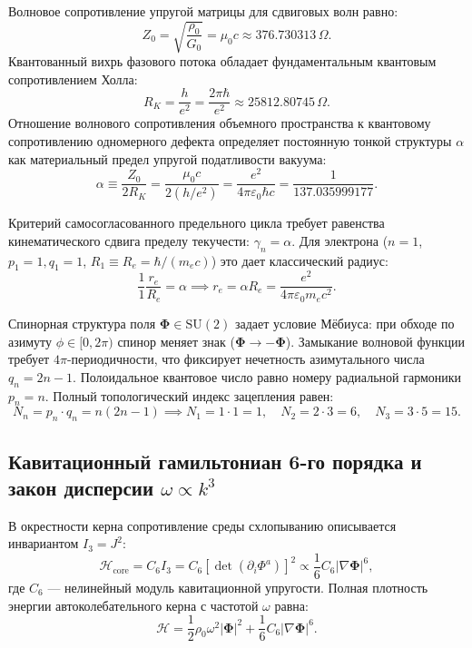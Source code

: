 \documentclass[11pt,a4paper]{article}
\theoremstyle{definition}
\theoremstyle{remark}
\begin{document}
Волновое сопротивление упругой матрицы для сдвиговых волн равно:
\begin{equation}
    Z_0 = \sqrt{\frac{\rho_0}{G_0}} = \mu_0 c \approx 376.730313\,\Omega.
\end{equation}
Квантованный вихрь фазового потока обладает фундаментальным квантовым сопротивлением Холла:
\begin{equation}
    R_K = \frac{h}{e^2} = \frac{2\pi \hbar}{e^2} \approx 25812.80745\,\Omega.
\end{equation}
Отношение волнового сопротивления объемного пространства к квантовому сопротивлению одномерного дефекта определяет постоянную тонкой структуры $\alpha$ как материальный предел упругой податливости вакуума:
\begin{equation}
    \alpha \equiv \frac{Z_0}{2 R_K} = \frac{\mu_0 c}{2 (h/e^2)} = \frac{e^2}{4\pi \varepsilon_0 \hbar c} = \frac{1}{137.035999177}.
    \label{eq:alpha_impedance}
\end{equation}

Критерий самосогласованного предельного цикла требует равенства кинематического сдвига пределу текучести: $\gamma_n = \alpha$. Для электрона ($n=1$, $p_1=1, q_1=1$, $R_1 \equiv R_e = \hbar/(m_e c)$) это дает классический радиус:
\begin{equation}
    \frac{1}{1} \frac{r_e}{R_e} = \alpha \implies r_e = \alpha R_e = \frac{e^2}{4\pi\varepsilon_0 m_e c^2}.
\end{equation}

Спинорная структура поля $\boldsymbol{\Phi} \in \mathrm{SU}(2)$ задает условие Мёбиуса: при обходе по азимуту $\phi \in [0, 2\pi)$ спинор меняет знак ($\boldsymbol{\Phi} \to -\boldsymbol{\Phi}$). Замыкание волновой функции требует $4\pi$-периодичности, что фиксирует нечетность азимутального числа $q_n = 2n - 1$. Полоидальное квантовое число равно номеру радиальной гармоники $p_n = n$. Полный топологический индекс зацепления равен:
\begin{equation}
    N_n = p_n \cdot q_n = n(2n - 1) \implies N_1 = 1 \cdot 1 = 1, \quad N_2 = 2 \cdot 3 = 6, \quad N_3 = 3 \cdot 5 = 15.
    \label{eq:n_spectrum}
\end{equation}

\subsection{Кавитационный гамильтониан 6-го порядка и закон дисперсии $\omega \propto k^3$}
В окрестности керна сопротивление среды схлопыванию описывается инвариантом $I_3 = J^2$:
\begin{equation}
    \mathcal{H}_{\mathrm{core}} = C_6 I_3 = C_6 \left[ \det\left(\partial_i \Phi^a\right) \right]^2 \propto \frac{1}{6} C_6 |\nabla \boldsymbol{\Phi}|^6,
\end{equation}
где $C_6$ --- нелинейный модуль кавитационной упругости. Полная плотность энергии автоколебательного керна с частотой $\omega$ равна:
\begin{equation}
    \mathcal{H} = \frac{1}{2} \rho_0 \omega^2 |\boldsymbol{\Phi}|^2 + \frac{1}{6} C_6 |\nabla \boldsymbol{\Phi}|^6.
\end{equation}
\end{document}
